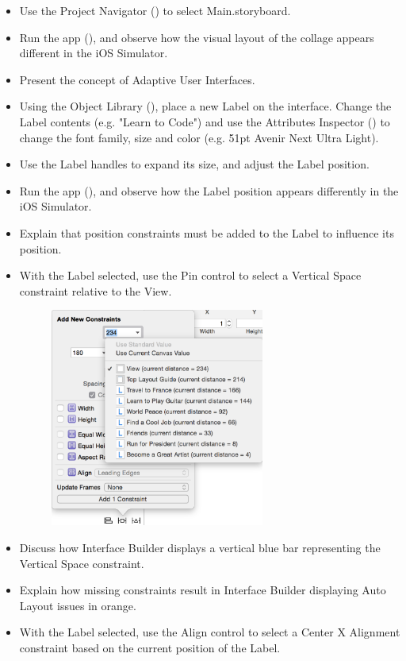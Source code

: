 \documentclass[a4paper,11pt]{scrartcl}
\begin{document}
\begin{itemize}
\item Use the Project Navigator () to select Main.storyboard.
\item Run the app (), and observe how the visual layout of the collage appears different in the iOS Simulator.
\item Present the concept of Adaptive User Interfaces.
\item Using the Object Library (), place a new Label on the interface. Change the Label contents (e.g. "Learn to Code") and use the Attributes Inspector () to change the font family, size and color (e.g. 51pt Avenir Next Ultra Light).
\item Use the Label handles to expand its size, and adjust the Label position.
\item Run the app (), and observe how the Label position appears differently in the iOS Simulator.
\item Explain that position constraints must be added to the Label to influence its position.
\item With the Label selected, use the Pin control to select a Vertical Space constraint relative to the View.
\begin{figure}[h]
	\begin{center}
   \includegraphics[width=200pt]{pin_constraint.png}
	\end{center}
\end{figure}
\item Discuss how Interface Builder displays a vertical blue bar representing the Vertical Space constraint.
\item Explain how missing constraints result in Interface Builder displaying Auto Layout issues in orange.
\item With the Label selected, use the Align control to select a Center X Alignment constraint based on the current position of the Label.

\end{itemize}
\end{document}
